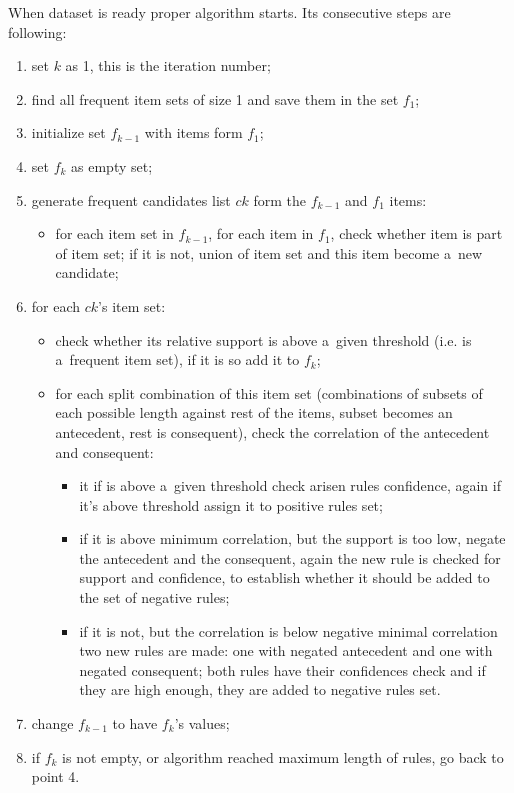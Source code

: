 \documentclass{article}
\begin{document}
	When dataset is ready proper algorithm starts. Its consecutive steps are following:
	\begin{enumerate}
		\item set $k$ as 1, this is the iteration number;
		\item find all frequent item sets of size 1 and save them in the set $f_{1}$;
		\item initialize set $f_{k-1}$ with items form $f_{1}$;
		\item set $f_{k}$ as empty set;
		\item generate frequent candidates list $ck$ form the $f_{k-1}$ and $f_{1}$ items:
		\begin{itemize}
			\item for each item set in $f_{k-1}$, for each item in $f_{1}$, check whether item is part of item set; if it is not, union of item set and this item become a~new candidate;
		\end{itemize}
		\item for each $ck$'s item set:
		\begin{itemize}
			\item check whether its relative support is above a~given threshold (i.e. is a~frequent item set), if it is so add it to $f_{k}$;
			\item for each split combination of this item set (combinations of subsets of each possible length against rest of the items, subset becomes an antecedent, rest is consequent), check the correlation of the antecedent and consequent:
			\begin{itemize}
				\item it if is above a~given threshold check arisen rules confidence, again if it's above threshold assign it to positive rules set;
				\item if it is above minimum correlation, but the support is too low, negate the antecedent and the consequent, again the new rule is checked for support and confidence, to establish whether it should be added to the set of negative rules;
				\item if it is not, but the correlation is below negative minimal correlation two new rules are made: one with negated antecedent and one with negated consequent; both rules have their confidences check and if they are high enough, they are added to negative rules set.
			\end{itemize}			
		\end{itemize}
		\item change $f_{k-1}$ to have $f_{k}$'s values;
		\item if $f_{k}$ is not empty, or algorithm reached maximum length of rules, go back to point 4.
	\end{enumerate}
	
\end{document}
